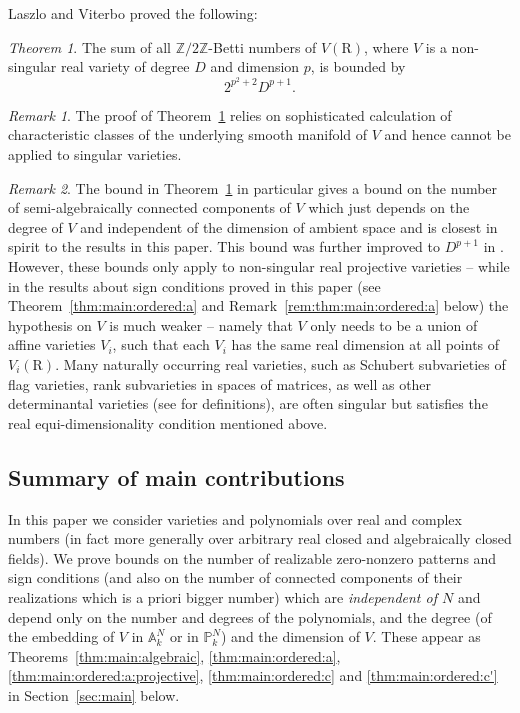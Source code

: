 \documentclass[10pt]{amsart}
\theoremstyle{definition}
\theoremstyle{remark}
\newtheorem{remark}{Remark}
\newtheorem{thmx}{Theorem}
\numberwithin{equation}{section}
\newcommand {\R} {\mathrm{R}}
\newcommand {\Z}  {\mathbb{Z}}
\newcommand {\PP}     {\mathbb{P}} %
\begin{document}
Laszlo and Viterbo \cite{Laszlo-Viterbo} proved the following:

\begin{thmx} \cite[Theorem 1.2]{Laszlo-Viterbo}
\label{thmx:LV}
    The sum of all $\Z/2\Z$-Betti numbers of $V(\R)$, where $V$ is a non-singular real variety of degree $D$ and dimension $p$, is bounded by 
    \[
    2^{p^2+2} D^{p+1}.
    \]
\end{thmx}

\begin{remark}
\label{rem:LV0}
    The proof of Theorem~\ref{thmx:LV} relies on sophisticated calculation of characteristic classes of the underlying smooth manifold of $V$ and hence cannot be applied to singular varieties.
\end{remark}

\begin{remark}
\label{rem:LV}
    The bound in Theorem~\ref{thmx:LV} in particular gives a bound on the number of semi-algebraically connected components of $V$ which just depends on the degree of $V$ and independent of the dimension of ambient space and is closest in spirit to the results in this paper. 
    This bound was further improved to $D^{p+1}$ in \cite{Kharlamov}. However, these bounds only apply to non-singular real projective varieties -- while in the results about sign conditions proved in this paper (see Theorem~\ref{thm:main:ordered:a} and Remark~\ref{rem:thm:main:ordered:a} below) 
    the hypothesis on $V$ is much weaker -- namely that $V$ only needs to be a union of  
    affine varieties $V_i$, such that each $V_i$ has the same real dimension at all points of $V_i(\R)$. Many naturally occurring real varieties, such as Schubert subvarieties of flag varieties,
    rank subvarieties in spaces of matrices, as well as other determinantal varieties (see \cite{Manivel} for definitions), are often singular but satisfies the real equi-dimensionality condition mentioned above. 
\end{remark}

\subsection{Summary of main contributions}
\label{subsec:contrib}
In this paper we consider varieties and polynomials over real and complex numbers (in fact more generally over arbitrary real closed and algebraically closed fields). We prove bounds on the number of realizable zero-nonzero patterns and sign conditions  
(and also on the number of connected components of their realizations which is a priori bigger number)
which are \emph{independent of $N$} and depend only on the number and degrees of the polynomials, 
and the degree (of the embedding of $V$ in $\mathbb{A}_k^N$ or in $\PP_k^N$) and the dimension of $V$. 
These appear as Theorems~\ref{thm:main:algebraic}, 
\ref{thm:main:ordered:a}, 
\ref{thm:main:ordered:a:projective}, \ref{thm:main:ordered:c} and
\ref{thm:main:ordered:c'} in Section~\ref{sec:main} below.
\end{document}
